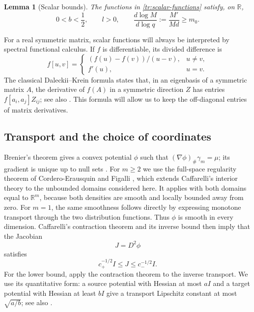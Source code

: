 \documentclass[11pt]{article}
\newtheorem{lemma}[theorem]{Lemma}
\theoremstyle{definition}
\theoremstyle{remark}
\numberwithin{equation}{section}
\begin{document}
\begin{lemma}[Scalar bounds]\label{tr:scalar-basic}
The functions in \eqref{tr:scalar-functions} satisfy, on $\mathbb R$,
\begin{equation}\label{tr:scalar-basic-equations}
 0<b<\frac12,\qquad l>0,\qquad
 \frac{d\log M}{d\log q}
 :=\frac{M'}{Md}\ge m_0.
\end{equation}
\end{lemma}

For a real symmetric matrix, scalar functions will always be interpreted
by spectral functional calculus.  If $f$ is differentiable, its divided
difference is
\begin{equation}\label{tr:divided-difference}
 f[u,v]=\begin{cases}(f(u)-f(v))/(u-v),&u\ne v,\\f'(u),&u=v.
 \end{cases}
\end{equation}
The classical Daleckii--Krein formula
\cite{DaleckiiKrein1965} states that, in an eigenbasis of a symmetric
matrix $A$, the derivative of $f(A)$ in a symmetric direction $Z$ has
entries $f[a_i,a_j]Z_{ij}$; see also
\cite[Section~2.4]{Noferini2017}.  This formula
will allow us to keep the off-diagonal entries of matrix derivatives.

\subsection{Transport and the choice of coordinates}

Brenier's theorem gives a convex potential $\phi$ such that
$(\nabla\phi)_\#\gamma_m=\mu$; its gradient is unique up to null sets
\cite{Brenier1991,McCann1995}.  For $m\ge2$ we use the full-space
regularity theorem of Cordero-Erausquin and Figalli
\cite[Theorem~1.1]{CorderoErausquinFigalli2019}, which extends
Caffarelli's interior theory \cite{Caffarelli1992} to the unbounded
domains considered here.  It applies with both domains equal to $\mathbb R^m$, because both densities
are smooth and locally bounded away from zero.  For $m=1$, the same
smoothness follows directly by expressing monotone transport through
the two distribution functions.  Thus $\phi$ is smooth in every dimension.
Caffarelli's contraction theorem \cite{Caffarelli2000} and its inverse
bound then imply that the Jacobian
\begin{equation}\label{tr:Jacobian}
 J=D^2\phi
\end{equation}
satisfies
\begin{equation}\label{tr:Jacobian-bounds}
 c_+^{-1/2}I\le J\le c_-^{-1/2}I.
\end{equation}
For the lower bound, apply the contraction theorem to the inverse
transport.  We use its quantitative form: a source potential with
Hessian at most $aI$ and a target potential with Hessian at least $bI$
give a transport Lipschitz constant at most $\sqrt{a/b}$; see also
\cite[Theorem~1]{ChewiPooladian2023}.
\end{document}
